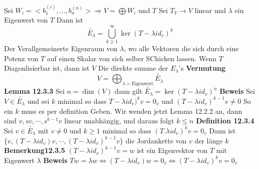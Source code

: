 \documentclass{article}
\begin{document}
Sei $W_i=<b_1^{(i)},...,b_n^{(n)}>\Rightarrow V=\bigoplus W_i$ und $T$ 
\newline Sei $T_V\rightarrow V$ linear und $\lambda$ ein Eigenwert von $T$ Dann ist \[\tilde{E_\lambda}=\bigcup_{k\ge1}^{\infty}\ker(T-\lambda id_v)^k\] Der Verallgemeinerte Eigenraum von $\lambda$, wo alle Vektoren die sich durch eine Potenz von $T$ auf einen Skalar von sich selber SChicken lassen.\newline
Wenn $T$ Diagonlisierbar ist, dann ist $V$ Die direkte summe der $E_\lambda$'s
\newline\textbf{Vermutung} \[V=\bigoplus_{\lambda=\text{Eigenwert}}\tilde{E_\lambda}\]
\newline\textbf{Lemma 12.3.3} Sei $n=\dim(V)$ dann gilt $\tilde{E_\lambda}=\ker(T-\lambda id_v)^n$
\newline\textbf{Beweis} Sei $V\in \tilde{E_\lambda}$ und sei $k$ minimal so dass $T-\lambda id_v)^kv=0_v$ und $(T-\lambda id_v)^{k-1}v\neq 0$ So ein $k$ muss es per definition Geben. Wir wenden jetzt Lemma 12.2.2 an, dann sind 
$v,sv,\cdots,s^{k-1}v$ linear unabhängig, und daraus folgt $k\le n$
\newline\textbf{Definition 12.3.4} Sei $v\in \tilde{E_\lambda}$ mit $v\neq 0$ und $k\ge1$ minimal so dass $(T.\lambda id_v)^kv=0_v$ Dann ist $\lbrace v,(T-\lambda id_v)v, \cdots ,(T-\lambda id_v)^{k-1}v\rbrace$ die Jordankette von $v$ der länge $k$
\newline\textbf{Bemerkung12.3.5} $(T-\lambda id_v)^{k-1}v=w$ ist ein Eigenvektor von $T$ mit Eigenwert $\lambda$
\newline\textbf{Beweis} $Tw=\lambda w\Leftrightarrow (T-\lambda id_v)w=0_v\Leftrightarrow (T-\lambda id_v)^k v=0_v$
\end{document}
